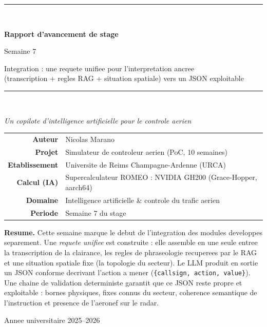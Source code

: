 \documentclass[11pt,a4paper]{article}
\begin{document}
\begin{titlepage}
\centering
\vspace*{1.2cm}
{\color{atcblue}\rule{\textwidth}{2pt}}\\[0.5cm]
{\Huge\bfseries\color{atcblue} Rapport d'avancement de stage\par}
\vspace{0.35cm}
{\LARGE\color{atcteal} Semaine 7\par}
\vspace{0.25cm}
{\large Integration : une requete unifiee pour l'interpretation ancree \\[2pt]
(transcription + regles RAG + situation spatiale) vers un JSON exploitable\par}
\vspace{0.4cm}
{\color{atcblue}\rule{\textwidth}{2pt}}\\[1.0cm]

{\large\itshape Un copilote d'intelligence artificielle pour le controle aerien\par}
\vspace{1.6cm}

\begin{tabular}{rl}
\large\bfseries Auteur & \large Nicolas Marano\\[4pt]
\large\bfseries Projet & \large Simulateur de controleur aerien (PoC, 10 semaines)\\[4pt]
\large\bfseries Etablissement & \large Universite de Reims Champagne-Ardenne (URCA)\\[4pt]
\large\bfseries Calcul (IA) & \large Supercalculateur ROMEO : NVIDIA GH200 (Grace-Hopper, aarch64)\\[4pt]
\large\bfseries Domaine & \large Intelligence artificielle \& controle du trafic aerien\\[4pt]
\large\bfseries Periode & \large Semaine 7 du stage\\
\end{tabular}

\vfill
\begin{tcolorbox}[colback=lightgray, colframe=atcblue, arc=3pt, width=0.92\textwidth, center,
  left=12pt, right=12pt, top=8pt, bottom=8pt]
\small\centering
\textbf{Resume.} Cette semaine marque le debut de l'integration des modules
developpes separement. Une \emph{requete unifiee} est construite : elle assemble en
une seule entree la transcription de la clairance, les regles de phraseologie
recuperees par le RAG et une situation spatiale fixe (la topologie du secteur). Le
LLM produit en sortie un JSON conforme decrivant l'action a mener
(\texttt{\{callsign, action, value\}}). Une chaine de validation deterministe garantit
que ce JSON reste propre et exploitable : bornes physiques, fixes connus du secteur,
coherence semantique de l'instruction et presence de l'aeronef sur le radar.
\end{tcolorbox}
\vspace{0.6cm}
{\small Annee universitaire 2025--2026}
\end{titlepage}
\end{document}
